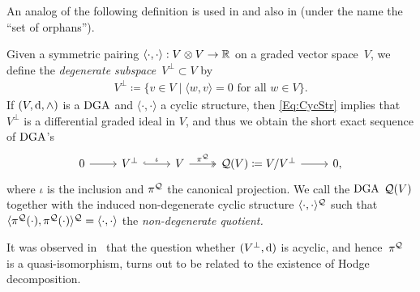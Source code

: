 \documentclass[\MainFolder/Text.tex]{subfiles}
\begin{document}
An analog of the following definition is used in \cite{Van2019} and also in \cite{Lambrechts2007} (under the name the ``set of orphans''). 

\begin{Definition}\label{Def:NonDegQ}
Given a symmetric pairing $\langle\cdot,\cdot\rangle: V\otimes V\rightarrow\mathbb{R}$ on a graded vector space~$V$, we define the \emph{degenerate subspace}~$V^\perp\subset V$ by 
\begin{align*}
V^\perp\coloneqq \{ v\in V \mid \langle w,v \rangle = 0\text{ for all }w\in V\}.
\end{align*}
If $(V,\mathrm{d},\wedge)$ is a $\mathrm{DGA}$ and $\langle\cdot,\cdot\rangle$ a cyclic structure, then \eqref{Eq:CycStr} implies that $V^\perp$ is a differential graded ideal in $V$, and thus we obtain the short exact sequence of $\mathrm{DGA}$'s
\begin{equation}\label{Eq:ImportantSES}
\begin{tikzcd}
0 \arrow{r} & V^\perp \arrow[hook]{r}{\iota} & V \arrow[two heads]{r}{\pi^\VansQuotient} & \VansQuotient(V) \coloneqq V / V^\perp \arrow{r} & 0,
\end{tikzcd}
\end{equation}
where $\iota$ is the inclusion and $\pi^{\mathcal{Q}}$ the canonical projection. We call the $\mathrm{DGA}$ $\mathcal{Q}(V)$ together with the induced non-degenerate cyclic structure $\langle\cdot,\cdot\rangle^{\mathcal{Q}}$ such that $\langle\pi^{\mathcal{Q}}(\cdot),\pi^{\mathcal{Q}}(\cdot)\rangle^{\mathcal{Q}} = \langle\cdot,\cdot\rangle$ the \emph{non-degenerate quotient.}
\end{Definition}

It was observed in~\cite{Van2019} that the question whether $(V^\perp,\mathrm{d})$ is acyclic, and hence~$\pi^{\mathcal{Q}}$ is a quasi-isomorphism, turns out to be related to the existence of Hodge decomposition.
\end{document}
